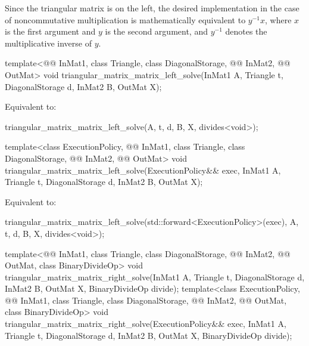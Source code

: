 \pnum
\begin{note}
Since the triangular matrix is on the left,
the desired  implementation
in the case of noncommutative multiplication
is mathematically equivalent to $y^{-1} x$,
where $x$ is the first argument and $y$ is the second argument,
and $y^{-1}$ denotes the multiplicative inverse of $y$.
\end{note}

\begin{itemdecl}
template<@@ InMat1, class Triangle, class DiagonalStorage,
         @@ InMat2, @@ OutMat>
  void triangular_matrix_matrix_left_solve(InMat1 A, Triangle t, DiagonalStorage d,
                                           InMat2 B, OutMat X);
\end{itemdecl}

\begin{itemdescr}
\pnum
\effects
Equivalent to:
\begin{codeblock}
triangular_matrix_matrix_left_solve(A, t, d, B, X, divides<void>{});
\end{codeblock}
\end{itemdescr}

\begin{itemdecl}
template<class ExecutionPolicy, @@ InMat1, class Triangle, class DiagonalStorage,
         @@ InMat2, @@ OutMat>
  void triangular_matrix_matrix_left_solve(ExecutionPolicy&& exec,
                                           InMat1 A, Triangle t, DiagonalStorage d,
                                           InMat2 B, OutMat X);
\end{itemdecl}

\begin{itemdescr}
\pnum
\effects
Equivalent to:
\begin{codeblock}
triangular_matrix_matrix_left_solve(std::forward<ExecutionPolicy>(exec),
                                    A, t, d, B, X, divides<void>{});
\end{codeblock}
\end{itemdescr}

\begin{itemdecl}
template<@@ InMat1, class Triangle, class DiagonalStorage,
         @@ InMat2, @@ OutMat, class BinaryDivideOp>
  void triangular_matrix_matrix_right_solve(InMat1 A, Triangle t, DiagonalStorage d,
                                            InMat2 B, OutMat X, BinaryDivideOp divide);
template<class ExecutionPolicy,
         @@ InMat1, class Triangle, class DiagonalStorage,
         @@ InMat2, @@ OutMat, class BinaryDivideOp>
  void triangular_matrix_matrix_right_solve(ExecutionPolicy&& exec,
                                            InMat1 A, Triangle t, DiagonalStorage d,
                                            InMat2 B, OutMat X, BinaryDivideOp divide);
\end{itemdecl}

